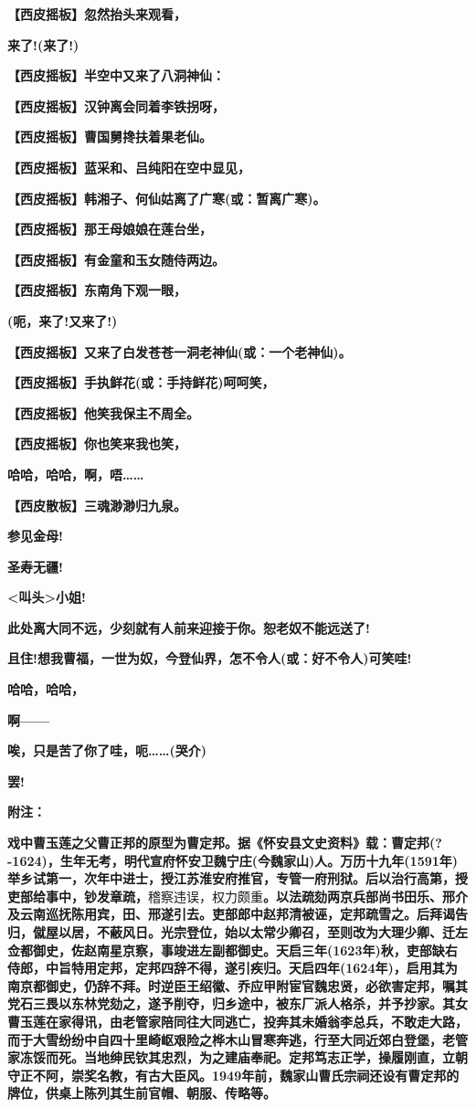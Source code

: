 \textbf{【西皮摇板】忽然抬头来观看，}

\textbf{来了!(来了!)}

\textbf{【西皮摇板】半空中又来了八洞神仙：}

\textbf{【西皮摇板】汉钟离会同着李铁拐呀，}

\textbf{【西皮摇板】曹国舅搀扶着果老仙。}

\textbf{【西皮摇板】蓝采和、吕纯阳在空中显见，}

\textbf{【西皮摇板】韩湘子、何仙姑离了广寒(或：暂离广寒)。}

\textbf{【西皮摇板】那王母娘娘在莲台坐，}

\textbf{【西皮摇板】有金童和玉女随侍两边。}

\textbf{【西皮摇板】东南角下观一眼，}

\textbf{(呃，来了!又来了!)}

\textbf{【西皮摇板】又来了白发苍苍一洞老神仙(或：一个老神仙)。}

\textbf{【西皮摇板】手执鲜花(或：手持鲜花)呵呵笑，}

\textbf{【西皮摇板】他笑我保主不周全。}

\textbf{【西皮摇板】你也笑来我也笑，}

\textbf{哈哈，哈哈，啊，唔\ldots{}\ldots{}}

\textbf{【西皮散板】三魂渺渺归九泉。}

\textbf{参见金母!}

\textbf{圣寿无疆!}

\textbf{\textless{}叫头\textgreater{}小姐!}

\textbf{此处离大同不远，少刻就有人前来迎接于你。恕老奴不能远送了!}

\textbf{且住!想我曹福，一世为奴，今登仙界，怎不令人(或：好不令人)可笑哇!}

\textbf{哈哈，哈哈，}

\textbf{啊------}

\textbf{唉，只是苦了你了哇，呃\ldots{}\ldots{}(哭介)}

\textbf{罢!}

\textbf{附注：}

\textbf{戏中曹玉莲之父曹正邦的原型为曹定邦。据《怀安县文史资料》载：曹定邦(?-1624)，生年无考，明代宣府怀安卫魏宁庄(今魏家山)人。万历十九年(1591年)举乡试第一，次年中进士，授江苏淮安府推官，专管一府刑狱。后以治行高第，授吏部给事中，钞发章疏，}稽察违误，权力颇重\textbf{。以法疏劾两京兵部尚书田乐、邢介及云南巡抚陈用宾，田、邢遂引去。吏部郎中赵邦清被诬，定邦疏雪之。后拜谒告归，僦屋以居，不蔽风日。光宗登位，始以太常少卿召，至则改为大理少卿、迁左佥都御史，佐赵南星京察，事竣进左副都御史。天启三年(1623年)秋，吏部缺右侍郎，中旨特用定邦，定邦四辞不得，遂引疾归。天启四年(1624年)，启用其为南京都御史，仍辞不拜。时逆臣王绍徽、乔应甲附宦官魏忠贤，必欲害定邦，嘱其党石三畏以东林党劾之，遂予削夺，归乡途中，被东厂派人格杀，并予抄家。其女曹玉莲在家得讯，由老管家陪同往大同逃亡，投奔其未婚翁李总兵，不敢走大路，而于大雪纷纷中自四十里崎岖艰险之桦木山冒寒奔逃，行至大同近郊白登堡，老管家冻馁而死。当地绅民钦其忠烈，为之建庙奉祀。定邦笃志正学，操履刚直，立朝守正不阿，崇奖名教，有古大臣风。1949年前，魏家山曹氏宗祠还设有曹定邦的牌位，供桌上陈列其生前官帽、朝服、传略等。}

